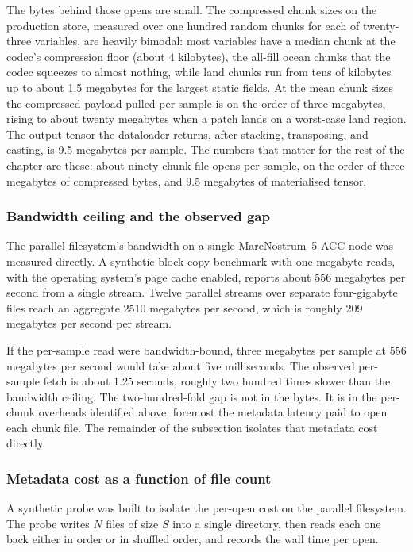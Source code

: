 \documentclass[12pt,a4paper]{article}
\begin{document}
The bytes behind those opens are small. The compressed chunk sizes on the production store,
measured over one hundred random chunks for each of twenty-three variables, are heavily
bimodal: most variables have a median chunk at the codec's compression floor (about 4
kilobytes), the all-fill ocean chunks that the codec squeezes to almost nothing, while land
chunks run from tens of kilobytes up to about 1.5 megabytes for the largest static fields. At
the mean chunk sizes the compressed payload pulled per sample is on the order of three
megabytes, rising to about twenty megabytes when a patch lands on a worst-case land region.
The output tensor the dataloader returns, after stacking, transposing, and casting, is 9.5
megabytes per sample. The numbers that matter for the rest of the chapter are these: about
ninety chunk-file opens per sample, on the order of three megabytes of compressed bytes, and
9.5 megabytes of materialised tensor.

\subsubsection{Bandwidth ceiling and the observed gap}\label{sec:bandwidth-ceiling}

The parallel filesystem's bandwidth on a single MareNostrum~5 ACC node was measured
directly. A synthetic block-copy benchmark with one-megabyte reads, with the operating
system's page cache enabled, reports about 556 megabytes per second from a single stream.
Twelve parallel streams over separate four-gigabyte files reach an aggregate 2510 megabytes
per second, which is roughly 209 megabytes per second per stream.

If the per-sample read were bandwidth-bound, three megabytes per sample at 556 megabytes per
second would take about five milliseconds. The observed per-sample fetch is about 1.25
seconds, roughly two hundred times slower than the bandwidth ceiling. The two-hundred-fold
gap is not in the bytes. It is in the per-chunk overheads identified above, foremost the
metadata latency paid to open each chunk file. The remainder of the subsection isolates
that metadata cost directly.

\subsubsection{Metadata cost as a function of file count}

A synthetic probe was built to isolate the per-open cost on the parallel filesystem. The
probe writes \(N\) files of size \(S\) into a single directory, then reads each one back
either in order or in shuffled order, and records the wall time per open.
\end{document}
